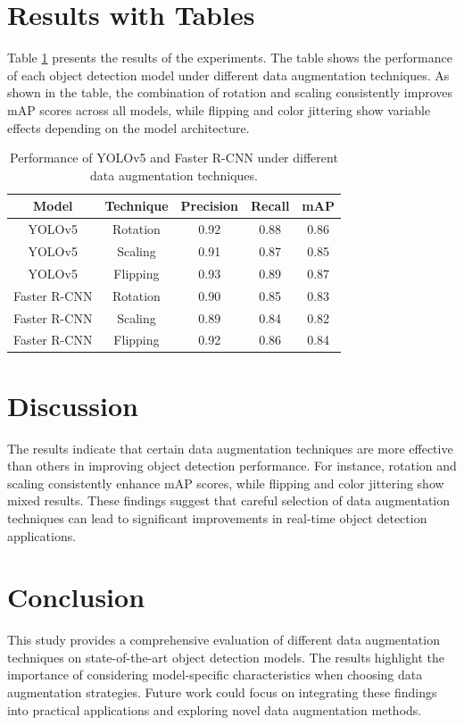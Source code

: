 \documentclass{article}
\begin{document}
\section{Results with Tables}
Table \ref{tab:results} presents the results of the experiments. The table shows the performance of each object detection model under different data augmentation techniques. As shown in the table, the combination of rotation and scaling consistently improves mAP scores across all models, while flipping and color jittering show variable effects depending on the model architecture.

\begin{table}[ht]
\centering
\begin{tabular}{|c|c|c|c|c|}
\hline
\textbf{Model} & \textbf{Technique} & \textbf{Precision} & \textbf{Recall} & \textbf{mAP} \\
\hline
YOLOv5 & Rotation & 0.92 & 0.88 & 0.86 \\
\hline
YOLOv5 & Scaling & 0.91 & 0.87 & 0.85 \\
\hline
YOLOv5 & Flipping & 0.93 & 0.89 & 0.87 \\
\hline
Faster R-CNN & Rotation & 0.90 & 0.85 & 0.83 \\
\hline
Faster R-CNN & Scaling & 0.89 & 0.84 & 0.82 \\
\hline
Faster R-CNN & Flipping & 0.92 & 0.86 & 0.84 \\
\hline
\end{tabular}
\caption{Performance of YOLOv5 and Faster R-CNN under different data augmentation techniques.}
\label{tab:results}
\end{table}

\section{Discussion}
The results indicate that certain data augmentation techniques are more effective than others in improving object detection performance. For instance, rotation and scaling consistently enhance mAP scores, while flipping and color jittering show mixed results. These findings suggest that careful selection of data augmentation techniques can lead to significant improvements in real-time object detection applications.

\section{Conclusion}
This study provides a comprehensive evaluation of different data augmentation techniques on state-of-the-art object detection models. The results highlight the importance of considering model-specific characteristics when choosing data augmentation strategies. Future work could focus on integrating these findings into practical applications and exploring novel data augmentation methods.
\end{document}
